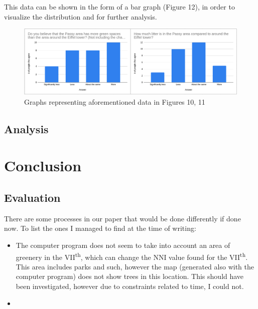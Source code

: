\documentclass[11pt,letterpaper]{article}
\begin{document}
This data can be shown in the form of a bar graph (Figure 12), in order to visualize the distribution and for further analysis.

\begin{figure}[H]
    \centering
    \includegraphics[width=1\linewidth]{media/graphs.png}
    \caption{Graphs representing aforementioned data in Figures 10, 11}
\end{figure}

\subsection{Analysis}



\section{Conclusion}
\label{sec:conclusion}

\subsection{Evaluation}

There are some processes in our paper that would be done differently if done now. To list the ones I managed to find at the time of writing:

\begin{itemize}

    \item The computer program does not seem to take into account an area of greenery in the VII\textsuperscript{th}, which can change the NNI value found for the VII\textsuperscript{th}. This area includes parks and such, however the map (generated also with the computer program) does not show trees in this location. This should have been investigated, however due to constraints related to time, I could not.
    \item

\end{itemize}

\newpage
{}
\end{document}
